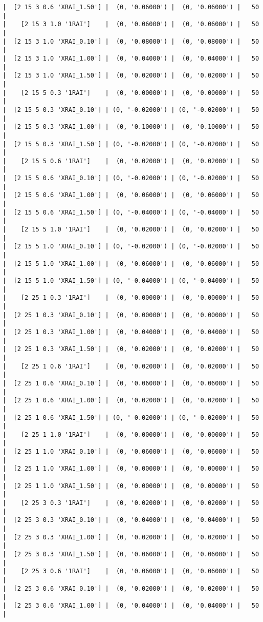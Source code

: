 \documentclass{article}
\begin{document}
\begin{verbatim}
|  [2 15 3 0.6 'XRAI_1.50'] |  (0, '0.06000') |  (0, '0.06000') |   50  |
|    [2 15 3 1.0 '1RAI']    |  (0, '0.06000') |  (0, '0.06000') |   50  |
|  [2 15 3 1.0 'XRAI_0.10'] |  (0, '0.08000') |  (0, '0.08000') |   50  |
|  [2 15 3 1.0 'XRAI_1.00'] |  (0, '0.04000') |  (0, '0.04000') |   50  |
|  [2 15 3 1.0 'XRAI_1.50'] |  (0, '0.02000') |  (0, '0.02000') |   50  |
|    [2 15 5 0.3 '1RAI']    |  (0, '0.00000') |  (0, '0.00000') |   50  |
|  [2 15 5 0.3 'XRAI_0.10'] | (0, '-0.02000') | (0, '-0.02000') |   50  |
|  [2 15 5 0.3 'XRAI_1.00'] |  (0, '0.10000') |  (0, '0.10000') |   50  |
|  [2 15 5 0.3 'XRAI_1.50'] | (0, '-0.02000') | (0, '-0.02000') |   50  |
|    [2 15 5 0.6 '1RAI']    |  (0, '0.02000') |  (0, '0.02000') |   50  |
|  [2 15 5 0.6 'XRAI_0.10'] | (0, '-0.02000') | (0, '-0.02000') |   50  |
|  [2 15 5 0.6 'XRAI_1.00'] |  (0, '0.06000') |  (0, '0.06000') |   50  |
|  [2 15 5 0.6 'XRAI_1.50'] | (0, '-0.04000') | (0, '-0.04000') |   50  |
|    [2 15 5 1.0 '1RAI']    |  (0, '0.02000') |  (0, '0.02000') |   50  |
|  [2 15 5 1.0 'XRAI_0.10'] | (0, '-0.02000') | (0, '-0.02000') |   50  |
|  [2 15 5 1.0 'XRAI_1.00'] |  (0, '0.06000') |  (0, '0.06000') |   50  |
|  [2 15 5 1.0 'XRAI_1.50'] | (0, '-0.04000') | (0, '-0.04000') |   50  |
|    [2 25 1 0.3 '1RAI']    |  (0, '0.00000') |  (0, '0.00000') |   50  |
|  [2 25 1 0.3 'XRAI_0.10'] |  (0, '0.00000') |  (0, '0.00000') |   50  |
|  [2 25 1 0.3 'XRAI_1.00'] |  (0, '0.04000') |  (0, '0.04000') |   50  |
|  [2 25 1 0.3 'XRAI_1.50'] |  (0, '0.02000') |  (0, '0.02000') |   50  |
|    [2 25 1 0.6 '1RAI']    |  (0, '0.02000') |  (0, '0.02000') |   50  |
|  [2 25 1 0.6 'XRAI_0.10'] |  (0, '0.06000') |  (0, '0.06000') |   50  |
|  [2 25 1 0.6 'XRAI_1.00'] |  (0, '0.02000') |  (0, '0.02000') |   50  |
|  [2 25 1 0.6 'XRAI_1.50'] | (0, '-0.02000') | (0, '-0.02000') |   50  |
|    [2 25 1 1.0 '1RAI']    |  (0, '0.00000') |  (0, '0.00000') |   50  |
|  [2 25 1 1.0 'XRAI_0.10'] |  (0, '0.06000') |  (0, '0.06000') |   50  |
|  [2 25 1 1.0 'XRAI_1.00'] |  (0, '0.00000') |  (0, '0.00000') |   50  |
|  [2 25 1 1.0 'XRAI_1.50'] |  (0, '0.00000') |  (0, '0.00000') |   50  |
|    [2 25 3 0.3 '1RAI']    |  (0, '0.02000') |  (0, '0.02000') |   50  |
|  [2 25 3 0.3 'XRAI_0.10'] |  (0, '0.04000') |  (0, '0.04000') |   50  |
|  [2 25 3 0.3 'XRAI_1.00'] |  (0, '0.02000') |  (0, '0.02000') |   50  |
|  [2 25 3 0.3 'XRAI_1.50'] |  (0, '0.06000') |  (0, '0.06000') |   50  |
|    [2 25 3 0.6 '1RAI']    |  (0, '0.06000') |  (0, '0.06000') |   50  |
|  [2 25 3 0.6 'XRAI_0.10'] |  (0, '0.02000') |  (0, '0.02000') |   50  |
|  [2 25 3 0.6 'XRAI_1.00'] |  (0, '0.04000') |  (0, '0.04000') |   50  |

\end{verbatim}
\end{document}
